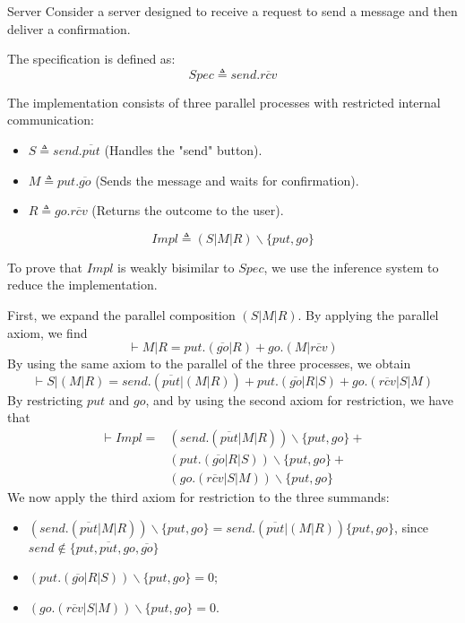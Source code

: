 \begin{Example}{Server}{}
    Consider a server designed to receive a request to send a message and then deliver a confirmation.

    The specification is defined as: 
    \begin{equation*}
        Spec\triangleq send.\overline{rcv}
    \end{equation*}

    The implementation consists of three parallel processes with restricted internal communication:
    \begin{itemize}
        \item $S\triangleq send.\overline{put}$ (Handles the "send" button).
        \item $M\triangleq put.\overline{go}$ (Sends the message and waits for confirmation).
        \item $R\triangleq go.\overline{rcv}$ (Returns the outcome to the user).
    \end{itemize}

    \begin{equation*}
        Impl\triangleq (S|M|R)\backslash\{put,go\}
    \end{equation*}

    To prove that $Impl$ is weakly bisimilar to $Spec$, we use the inference system to reduce the implementation.

    First, we expand the parallel composition $(S|M|R)$. By applying the parallel axiom, we find 
    \begin{equation*}
        \vdash M|R = put.(\overline{go}|R)+go.(M|\overline{rcv})
    \end{equation*}
    By using the same axiom to the parallel of the three processes, we obtain
    \begin{equation*}
        \vdash S|(M|R) = send.(\overline{put}|(M|R)) + 
        put.(\overline{go}|R|S) + go.(\overline{rcv}|S|M)
    \end{equation*}
    By restricting $put$ and $go$, and by using the second axiom for restriction, we have that
    \begin{align*}
        \vdash Impl =& (send.(\overline{put}|M |R))\backslash\{put, go\} +\\
        &(put.(\overline{go}|R|S))\backslash\{put, go\} +\\
        & (go.(\overline{rcv}|S|M))\backslash\{put, go\}
    \end{align*}
    We now apply the third axiom for restriction to the three summands:
    \begin{itemize}
        \item $(send.(\overline{put}|M |R))\backslash\{put, go\} = send.(\overline{put}|(M |R))\{put, go\}$, since $send \notin \{put, \overline{put}, go, \overline{go}\}$
        \item $(put.(\overline{go}|R|S))\backslash\{put, go\} = 0$;
        \item $(go.(\overline{rcv}|S|M ))\backslash\{put, go\} = 0$.
    \end{itemize}


\end{Example}

